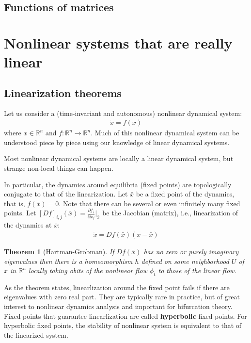 \documentclass[a4paper,11pt]{exam}
\newtheorem{theorem}{Theorem}
\newcounter{ct}
\newcommand{\field}[1]{\ensuremath{\mathbb{#1}}}
\newcommand{\reals}{\field{R}}
\begin{document}
\begin{questions}
\subsection{Functions of matrices}

\newpage
\section{Nonlinear systems that are really linear}
\subsection{Linearization theorems}
Let us consider a (time-invariant and autonomous) nonlinear dynamical system:
\begin{align}
    \dot{x} = f(x)
\end{align}
where $x \in \reals^n$ and $f: \reals^n \to \reals^n$.
Much of this nonlinear dynamical system can be understood piece by piece using our knowledge of linear dynamical systems.

\begin{tcolorbox}[colback=black!1!,title=Linearize that beast!]
    Most nonlinear dynamical systems are locally a linear dynamical system, but strange non-local things can happen.
\end{tcolorbox}

In particular, the dynamics around equilibria (fixed points) are topologically conjugate to that of the linearization.
Let $\bar{x}$ be a fixed point of the dynamics, that is, $f(\bar{x}) = 0$.
Note that there can be several or even infinitely many fixed points.
Let $[Df]_{i,j}(\bar{x}) = \frac{\partial f_i}{\partial x_j}\bigr\rvert_{\bar{x}}$ be the Jacobian (matrix), i.e., linearization of the dynamics at $\bar{x}$:
\begin{align}\label{eq:linearized_around_FP}
    \dot{x} = Df(\bar{x}) (x - \bar{x})
\end{align}

\begin{theorem}[Hartman-Grobman]
    If $Df(\bar{x})$ has no zero or purely imaginary eigenvalues then there is a homeomorphism $h$ defined on some neighborhood $U$ of $\bar{x}$ in $\reals^n$ locally taking obits of the nonlinear flow $\phi_t$ to those of the linear flow.
\end{theorem}
As the theorem states, linearlization around the fixed point fails if there are eigenvalues with zero real part.
They are typically rare in practice, but of great interest to nonlinear dynamics analysis and important for bifurcation theory.
Fixed points that guarantee linearlization are called \textbf{hyperbolic} fixed points.
For hyperbolic fixed points, the stability of nonlinear system is equivalent to that of the linearized system.


\end{questions}
\end{document}
